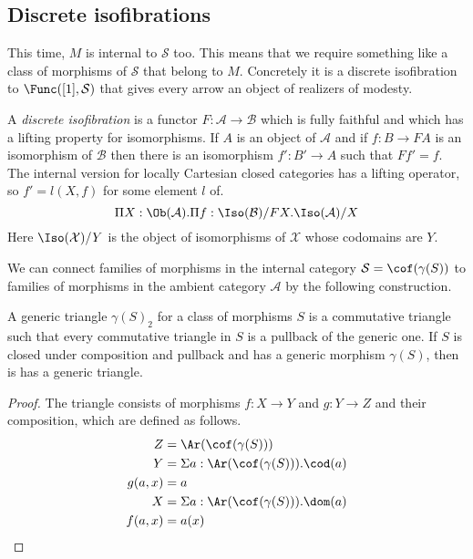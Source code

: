 \documentclass{tac}
\newcommand\hide[1]{}
\newcommand\cat\mathcal
\newcommand\of{:}
\newcommand\gen\gamma
\begin{document}
\subsection{Discrete isofibrations}
This time, $M$ is internal to $\cat S$ too. This means that we require something like a class of morphisms of $\cat S$ that belong to $M$. Concretely it is a discrete isofibration to $\Func([1],\cat S)$ that gives every arrow an object of realizers of modesty.

\hide{replace discrete isofibrations with presheaves of the core or something like that. Couldn't we?}



\begin{definition}
A \emph{discrete isofibration} is a functor $F\of\cat A\to \cat B$ which is fully faithful and which has a lifting property for isomorphisms. If $A$ is an object of $\cat A$ and if $f\of B\to FA$ is an isomorphism of $\cat B$ then there is an isomorphism $f'\of B'\to A$ such that $Ff'=f$. The internal version for locally Cartesian closed categories has a lifting operator, so $f'=l(X,f)$ for some element $l$ of.
\[ \Pi X\of \Ob(\cat A).\Pi f\of \Iso(\cat B)/FX. \Iso(\cat A)/X \]
Here $\Iso(\cat X)/Y$ is the object of isomorphisms of $\cat X$ whose codomains are $Y$.\label{discrete isofibrations}
\end{definition}

We can connect families of morphisms in the internal category $\cat S=\cof(\gen(S))$ to families of morphisms in the ambient category $\cat A$ by the following construction.

\begin{lemma}
A generic triangle $\gen(S)_2$ for a class of morphisms $S$ is a commutative triangle such that every commutative triangle in $S$ is a pullback of the generic one. If $S$ is closed under composition and pullback and has a generic morphism $\gen(S)$, then is has a generic triangle.
\end{lemma}

\begin{proof}
The triangle consists of morphisms $f\of X\to Y$ and $g\of Y\to Z$ and their composition, which are defined as follows.
\begin{align*}
Z &= \Ar(\cof(\gen(S)))\\
Y &= \Sigma a\of\Ar(\cof(\gen(S))).\cod(a)\\
g(a,x) &= a\\
X &= \Sigma a\of\Ar(\cof(\gen(S))).\dom(a)\\
f(a,x) &= a(x)
\end{align*}

\hide{actually construct the characteristic morphisms}
\end{proof}
\end{document}
